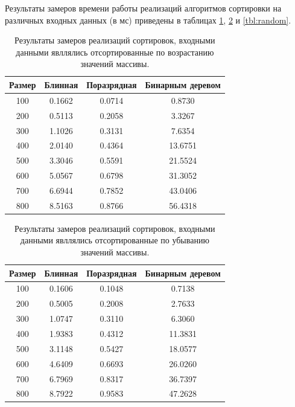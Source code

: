 Результаты замеров времени работы реализаций алгоритмов сортировки на различных входных данных (в мс) приведены в таблицах \ref{tbl:best}, \ref{tbl:worth} и \ref{tbl:random}.

\begin{table}[h]
	\begin{center}
		\begin{threeparttable}
		\captionsetup{justification=raggedright,singlelinecheck=off}
		\caption{Результаты замеров реализаций сортировок, входными данными явллялись отсортированные по возрастанию значений массивы.}
		\label{tbl:best}
		\begin{tabular}{|c|c|c|c|}
			\hline
			Размер & Блинная &  Поразрядная &  Бинарным деревом \\
			\hline
			100 & 0.1662 & 0.0714 & 0.8730 \\ 
			\hline
			200 & 0.5113 & 0.2058 & 3.3267 \\ 
			\hline
			300 & 1.1026 & 0.3131 & 7.6354 \\ 
			\hline
			400 & 2.0140 & 0.4364 & 13.6751 \\ 
			\hline
			500 & 3.3046 & 0.5591 & 21.5524 \\ 
			\hline
			600 & 5.0567 & 0.6798 & 31.3052 \\ 
			\hline
			700 & 6.6944 & 0.7852 & 43.0406 \\ 
			\hline
			800 & 8.5163 & 0.8766 & 56.4318 \\ 
			\hline
		\end{tabular}
		\end{threeparttable}
    \end{center}
\end{table}


\begin{table}[h]
	\begin{center}
		\begin{threeparttable}
		\captionsetup{justification=raggedright,singlelinecheck=off}
		\caption{Результаты замеров реализаций сортировок, входными данными явллялись отсортированные по убыванию значений массивы.}
		\label{tbl:worth}
		\begin{tabular}{|c|c|c|c|}
			\hline
			Размер & Блинная &  Поразрядная &  Бинарным деревом \\
			\hline
			100 & 0.1606 & 0.1048 & 0.7138 \\ 
			\hline
			200 & 0.5005 & 0.2008 & 2.7633 \\ 
			\hline
			300 & 1.0747 & 0.3110 & 6.3060 \\ 
			\hline
			400 & 1.9383 & 0.4312 & 11.3831 \\ 
			\hline
			500 & 3.1148 & 0.5427 & 18.0577 \\ 
			\hline
			600 & 4.6409 & 0.6693 & 26.0260 \\ 
			\hline
			700 & 6.7969 & 0.8317 & 36.7397 \\ 
			\hline
			800 & 8.7922 & 0.9583 & 47.2628 \\ 
			\hline
		\end{tabular}
		\end{threeparttable}
    \end{center}
\end{table}


